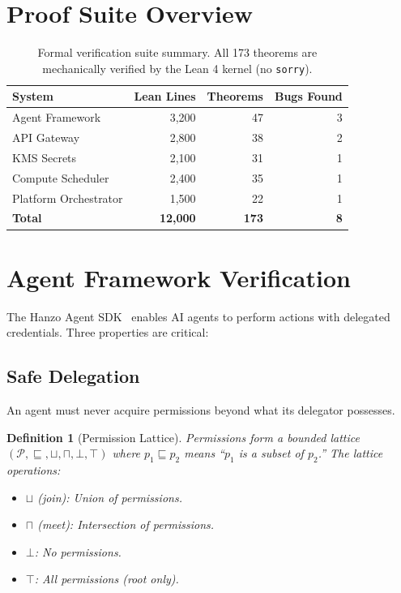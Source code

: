 \documentclass[11pt]{article}
\newtheorem{definition}{Definition}
\begin{document}
\section{Proof Suite Overview}
\label{sec:overview}

\begin{table}[H]
\centering
\small
\begin{tabular}{lrrr}
\toprule
\textbf{System} & \textbf{Lean Lines} & \textbf{Theorems} & \textbf{Bugs Found} \\
\midrule
Agent Framework & 3,200 & 47 & 3 \\
API Gateway & 2,800 & 38 & 2 \\
KMS Secrets & 2,100 & 31 & 1 \\
Compute Scheduler & 2,400 & 35 & 1 \\
Platform Orchestrator & 1,500 & 22 & 1 \\
\midrule
\textbf{Total} & \textbf{12,000} & \textbf{173} & \textbf{8} \\
\bottomrule
\end{tabular}
\caption{Formal verification suite summary. All 173 theorems are
mechanically verified by the Lean 4 kernel (no \texttt{sorry}).}
\label{tab:overview}
\end{table}

\section{Agent Framework Verification}
\label{sec:agents}

The Hanzo Agent SDK~\cite{hanzoagentsdk} enables AI agents to perform
actions with delegated credentials. Three properties are critical:

\subsection{Safe Delegation}

An agent must never acquire permissions beyond what its delegator possesses.

\begin{definition}[Permission Lattice]
Permissions form a bounded lattice $(\mathcal{P}, \sqsubseteq, \sqcup, \sqcap,
\bot, \top)$ where $p_1 \sqsubseteq p_2$ means ``$p_1$ is a subset of $p_2$.''
The lattice operations:
\begin{itemize}[leftmargin=1.1em]
    \item $\sqcup$ (join): Union of permissions.
    \item $\sqcap$ (meet): Intersection of permissions.
    \item $\bot$: No permissions.
    \item $\top$: All permissions (root only).
\end{itemize}
\end{definition}
\end{document}
